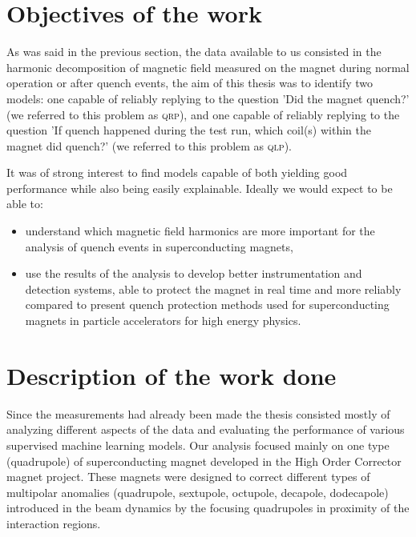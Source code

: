 \documentclass[a4paper, notitlepage]{article}
\begin{document}
\section{Objectives of the work}
As was said in the previous section, the data available to us consisted in the harmonic
decomposition of magnetic field measured on the magnet during normal operation or after quench
events, the aim of this thesis was to identify two models: one capable of reliably
replying to the question 'Did the magnet quench?' (we referred to this problem as \textsc{qrp}), and
one capable of reliably replying to the question 'If quench happened during the test run, which
coil(s) within the magnet did quench?' (we referred to this problem as \textsc{qlp}).

It was of strong interest to find models capable of both yielding good performance while also being
easily explainable. Ideally we would expect to be able to:
\begin{itemize}
	\item understand which magnetic field harmonics are more important for the analysis of
	      quench events in superconducting magnets,
	\item use the results of the analysis to develop better instrumentation and detection
	      systems, able to protect the magnet in real time and more reliably compared to
	      present quench protection methods used for superconducting magnets in particle
	      accelerators for high energy physics.
\end{itemize}

\section{Description of the work done}
Since the measurements had already been made the thesis consisted mostly of analyzing different
aspects of the data and evaluating the performance of various supervised machine learning models. Our analysis
focused mainly on one type (quadrupole) of superconducting magnet developed in the High Order
Corrector magnet project. These magnets were designed to correct different types of multipolar
anomalies (quadrupole, sextupole, octupole, decapole, dodecapole) introduced in the beam dynamics by
the focusing quadrupoles in proximity of the interaction regions.
\end{document}
